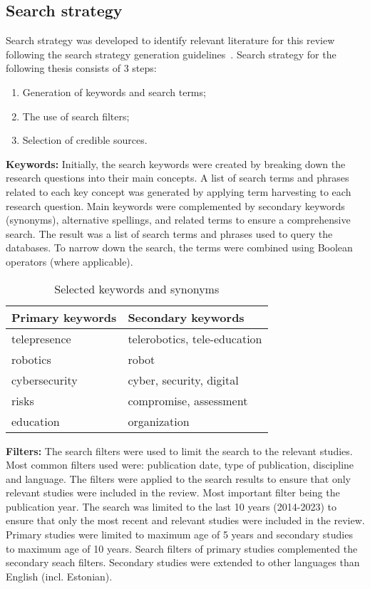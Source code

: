 \subsection{Search strategy}\label{subsec:search-strategy}

Search strategy was developed to identify relevant literature for this review following the search strategy generation guidelines~\cite[7-8]{systematic_review_2004}. Search strategy for the following thesis consists of 3 steps:

\begin{enumerate}
  \item Generation of keywords and search terms;
  \item The use of search filters;
  \item Selection of credible sources.
\end{enumerate}

\textbf{Keywords:} Initially, the search keywords were created by breaking down the research questions into their main concepts. A list
of search terms and phrases related to each key concept was generated by applying term harvesting to each research question. Main keywords
were
complemented by secondary keywords (synonyms), alternative spellings, and related terms to ensure a comprehensive search. The
result was a list of
search terms and phrases used to query the databases. To narrow down the search, the terms were combined using Boolean operators (where
applicable).

\begin{table}[h]
  \centering
  \smaller
  \caption{Selected keywords and synonyms}
  \label{tab:keywords}
  \begin{tabular}{ll}
    \toprule
    \textbf{Primary keywords} & \textbf{Secondary keywords}  \\\midrule
    telepresence              & telerobotics, tele-education \\
    robotics                  & robot                        \\
    cybersecurity             & cyber, security, digital     \\
    risks                     & compromise, assessment       \\
    education                 & organization                 \\\bottomrule
  \end{tabular}
\end{table}

\textbf{Filters:} The search filters were used to limit the search to the relevant studies. Most common filters used were: publication
date, type of publication, discipline and language. The filters were applied to the search results to ensure that only relevant studies were
included in the review. Most important filter being the publication year. The search was limited to the last 10 years (2014-2023) to
ensure that only the most recent and relevant studies were included in the review. Primary studies were limited to maximum age of 5
years and secondary studies to maximum age of 10 years. Search filters of primary studies complemented the secondary seach filters.
Secondary studies were extended to other languages than English (incl. Estonian).

